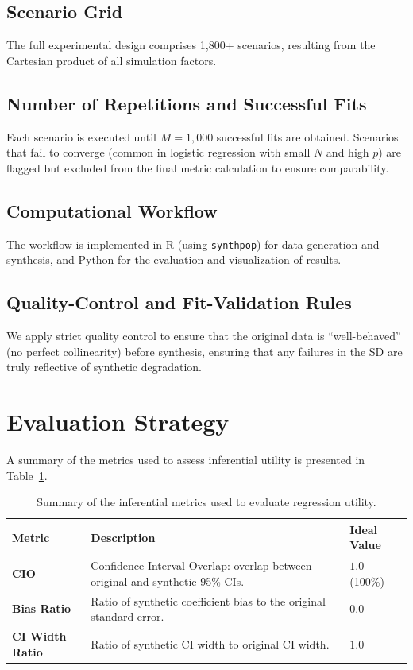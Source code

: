\subsection{Scenario Grid}
The full experimental design comprises 1,800+ scenarios, resulting from the Cartesian product of all simulation factors.

\subsection{Number of Repetitions and Successful Fits}
Each scenario is executed until $M=1,000$ successful fits are obtained. Scenarios that fail to converge (common in logistic regression with small $N$ and high $p$) are flagged but excluded from the final metric calculation to ensure comparability.

\subsection{Computational Workflow}
The workflow is implemented in R (using \texttt{synthpop}) for data generation and synthesis, and Python for the evaluation and visualization of results.

\subsection{Quality-Control and Fit-Validation Rules}
We apply strict quality control to ensure that the original data is ``well-behaved'' (no perfect collinearity) before synthesis, ensuring that any failures in the SD are truly reflective of synthetic degradation.

\section{Evaluation Strategy}
\label{sec:reg-evaluation}

A summary of the metrics used to assess inferential utility is presented in Table~\ref{tab:regression_metrics}.

\begin{table}[H]
  \centering
  \caption[Summary of Regression Evaluation Metrics]{Summary of the inferential metrics used to evaluate regression utility.}
  \label{tab:regression_metrics}
  \renewcommand{\arraystretch}{1.3}
  \begin{tabular}{@{}lp{8cm}l@{}}
    \toprule
    \textbf{Metric} & \textbf{Description} & \textbf{Ideal Value} \\ \midrule
    \textbf{CIO} & Confidence Interval Overlap: overlap between original and synthetic 95\% CIs. & $1.0$ (100\%) \\
    \textbf{Bias Ratio} & Ratio of synthetic coefficient bias to the original standard error. & $0.0$ \\
    \textbf{CI Width Ratio} & Ratio of synthetic CI width to original CI width. & $1.0$ \\ \bottomrule
  \end{tabular}
\end{table}

